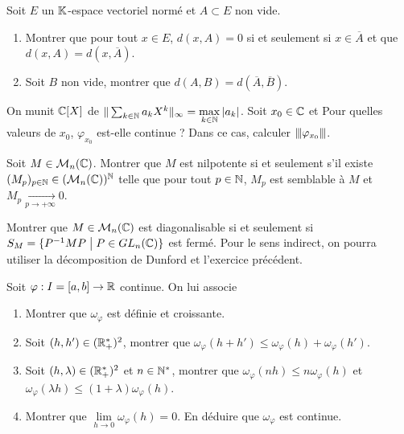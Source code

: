 \documentclass[12pt]{article}
\begin{document}
\begin{exercise}
	Soit $E$ un $\mathbb{K}$-espace vectoriel normé et $A\subset E$ non vide.
	\begin{enumerate}
		\item Montrer que pour tout $x\in E$, $d(x,A)=0$ si et seulement si $x\in\overline{A}$ et que $d(x,A)=d(x,\overline{A})$.
		\item Soit $B$ non vide, montrer que $d(A,B)=d(\overline{A},\overline{B})$.
	\end{enumerate}
\end{exercise}

\begin{exercise}
	On munit $\mathbb{C}[X]$ de $\Vert\sum_{k\in\mathbb{N}}a_{k}X^{k}\Vert_{\infty}=\max\limits_{k\in\mathbb{N}}\vert a_{k}\vert$. Soit $x_{0}\in\mathbb{C}$ et 
	Pour quelles valeurs de $x_{0}$, $\varphi_{x_{0}}$ est-elle continue ? Dans ce cas, calculer ${\left\vert\kern-0.25ex\left\vert\kern-0.25ex\left\vert{}\varphi_{x_{0}} \right\vert\kern-0.25ex\right\vert\kern-0.25ex\right\vert}$.
\end{exercise}

\begin{exercise}
	Soit $M\in\mathcal{M}_{n}(\mathbb{C})$. Montrer que $M$ est nilpotente si et seulement s'il existe $(M_{p})_{p\in\mathbb{N}}\in(\mathcal{M}_{n}(\mathbb{C}))^{\mathbb{N}}$ telle que pour tout $p\in\mathbb{N}$, $M_{p}$ est semblable à $M$ et $M_{p}\xrightarrow[p\to+\infty]{}0$.
\end{exercise}

\begin{exercise}
	Montrer que $M\in\mathcal{M}_{n}(\mathbb{C})$ est diagonalisable si et seulement si $S_{M}=\{P^{-1}MP\bigm| P\in GL_{n}(\mathbb{C})\}$ est fermé. Pour le sens indirect, on pourra utiliser la décomposition de Dunford et l'exercice précédent.
\end{exercise}

\begin{exercise}
	Soit $\varphi:I=[a,b]\to\mathbb{R}$ continue. On lui associe 
	\begin{enumerate}
		\item Montrer que $\omega_{\varphi}$ est définie et croissante.
		\item Soit $(h,h')\in(\mathbb{R}_{+}^{*})^{2}$, montrer que $\omega_{\varphi}(h+h')\leqslant\omega_{\varphi}(h)+\omega_{\varphi}(h')$.
		\item Soit $(h,\lambda)\in(\mathbb{R}_{+}^{*})^{2}$ et $n\in\mathbb{N}^{*}$, montrer que $\omega_{\varphi}(nh)\leqslant n\omega_{\varphi}(h)$ et $\omega_{\varphi}(\lambda h)\leqslant (1+\lambda)\omega_{\varphi}(h)$.
		\item Montrer que $\lim\limits_{h\to 0}\omega_{\varphi}(h)=0$. En déduire que $\omega_{\varphi}$ est continue.
	\end{enumerate}
\end{exercise}
\end{document}
